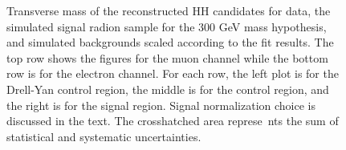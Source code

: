\begin{figure}[tbp]
\begin{center}
    \caption{Transverse mass of the reconstructed HH candidates for data, the simulated signal radion sample
    for the 300 GeV mass hypothesis, and simulated backgrounds scaled according to the fit results. The top
    row shows the figures for the muon channel while the bottom row is for the electron channel. For each row,
    the left plot is for the Drell-Yan control region, the middle is for the \ttbar control region, and the right
    is for the signal region. Signal normalization choice is discussed in the text. The crosshatched area represe\
nts
    the sum of statistical and systematic uncertainties.}
    \label{fig:MCcomparisons_radion}
%                                                                                                                 
  \end{center}
\end{figure}







